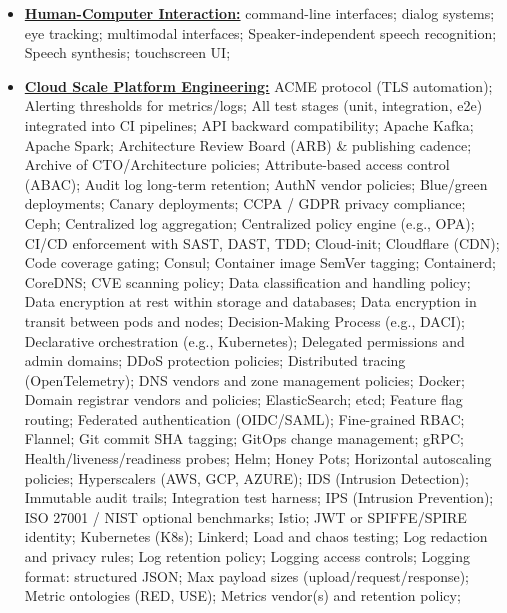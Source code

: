 \documentclass[letterpaper,11pt]{article}
\begin{document}
\begin{multicols}{3}
{\begin{itemize}[leftmargin=0.1in, label={}, itemsep=0pt, parsep=0pt, topsep=0pt, partopsep=0pt]
\item
    \textbf{\uline{Human-Computer Interaction:}} \hspace{0pt}
    command-line interfaces;
    dialog systems;
    eye tracking;
    multimodal interfaces;
    Speaker-independent speech recognition;
    Speech synthesis;
    touchscreen UI;
\item
    \textbf{\uline{Cloud Scale Platform Engineering:}} \hspace{0pt}
    ACME protocol (TLS automation);
    Alerting thresholds for metrics/logs;
    All test stages (unit, integration, e2e) integrated into CI pipelines;
    API backward compatibility;
    Apache Kafka;
    Apache Spark;
    Architecture Review Board (ARB) \& publishing cadence;
    Archive of CTO/Architecture policies;
    Attribute-based access control (ABAC);
    Audit log long-term retention;
    AuthN vendor policies;
    Blue/green deployments;
    Canary deployments;
    CCPA / GDPR privacy compliance;
    Ceph;
    Centralized log aggregation;
    Centralized policy engine (e.g., OPA);
    CI/CD enforcement with SAST, DAST, TDD;
    Cloud-init;
    Cloudflare (CDN);
    Code coverage gating;
    Consul;
    Container image SemVer tagging;
    Containerd;
    CoreDNS;
    CVE scanning policy;
    Data classification and handling policy;
    Data encryption at rest within storage and databases;
    Data encryption in transit between pods and nodes;
    Decision-Making Process (e.g., DACI);
    Declarative orchestration (e.g., Kubernetes);
    Delegated permissions and admin domains;
    DDoS protection policies;
    Distributed tracing (OpenTelemetry);
    DNS vendors and zone management policies;
    Docker;
    Domain registrar vendors and policies;
    ElasticSearch;
    etcd;
    Feature flag routing;
    Federated authentication (OIDC/SAML);
    Fine-grained RBAC;
    Flannel;
    Git commit SHA tagging;
    GitOps change management;
    gRPC;
    Health/liveness/readiness probes;
    Helm;
    Honey Pots;
    Horizontal autoscaling policies;
    Hyperscalers (AWS, GCP, AZURE);
    IDS (Intrusion Detection);
    Immutable audit trails;
    Integration test harness;
    IPS (Intrusion Prevention);
    ISO 27001 / NIST optional benchmarks;
    Istio;
    JWT or SPIFFE/SPIRE identity;
    Kubernetes (K8s);
    Linkerd;
    Load and chaos testing;
    Log redaction and privacy rules;
    Log retention policy;
    Logging access controls;
    Logging format: structured JSON;
    Max payload sizes (upload/request/response);
    Metric ontologies (RED, USE);
    Metrics vendor(s) and retention policy;

\end{itemize}}
\end{multicols}
\end{document}
